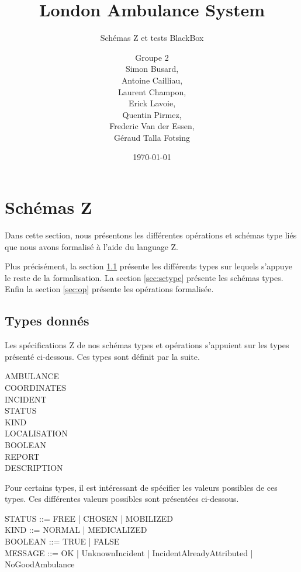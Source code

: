 \documentclass{report}
\title{London Ambulance System}
\subtitle{Schémas Z et tests BlackBox}
\author{\normalsize{Groupe 2}\\
\footnotesize{
Simon Busard, \\
Antoine Cailliau, \\
Laurent Champon,\\
Erick Lavoie, \\
Quentin Pirmez,\\
Frederic Van der Essen, \\
Géraud Talla Fotsing}}
\date{\today}
\begin{document}
\setlength{\parskip}{1em}
\startdocument

\maketitle
\setcounter{tocdepth}{1}
\tableofcontents

\chapter{Schémas Z}

Dans cette section, nous présentons les différentes opérations et
schémas type liés que nous avons formalisé à l'aide du language Z.

Plus précisément, la section \ref{sec:type} présente les différents
types sur lequels s'appuye le reste de la formalisation. La section
\ref{sec:sctype} présente les schémas types. Enfin la section
\ref{sec:op} présente les opérations formalisée.

\section{Types donnés}\label{sec:type}
Les spécifications Z de nos schémas types et 
opérations s'appuient sur les types présenté ci-dessous. Ces types sont
définit par la suite.
\begin{zed}
AMBULANCE \\
COORDINATES \\
INCIDENT \\
STATUS  \\
KIND \\
LOCALISATION \\
BOOLEAN \\
REPORT  \\
DESCRIPTION
\end{zed}

Pour certains types, il est intéressant de spécifier les valeurs 
possibles de ces types. Ces différentes valeurs possibles sont présentées
ci-dessous.
\begin{syntax}
STATUS ::= FREE | CHOSEN | MOBILIZED \\
KIND ::= NORMAL | MEDICALIZED \\
BOOLEAN ::= TRUE  | FALSE \\
MESSAGE ::= OK | UnknownIncident | IncidentAlreadyAttributed | NoGoodAmbulance
\end{syntax}
\end{document}
